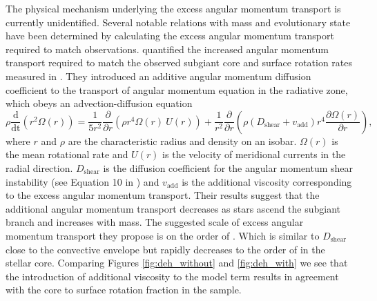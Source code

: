 The physical mechanism underlying the excess angular momentum transport is currently unidentified.
Several notable relations with mass and evolutionary state have been determined by calculating the excess angular momentum transport required to match observations. 
\citet{spada_angular_2016} quantified the increased angular momentum transport required to match the observed subgiant core and surface rotation rates measured in \citet{deheuvels_seismic_2014}.
They introduced an additive angular momentum diffusion coefficient to the transport of angular momentum equation in the radiative zone, which obeys an advection-diffusion equation 
\begin{equation}
    \rho \frac{\text{d}}{\text{dt}}\left(r^2 \Omega \left( r \right)\right) = \frac{1}{5r^2}\frac{\partial}{\partial r}\left(\rho r^4 \Omega \left( r \right)
 \ U\left(r\right)\right) + \frac{1}{r^2}\frac{\partial}{\partial r} \left(\rho \left( D_{\text{shear}} + v_{\text{add}}\right) r^4 \frac{\partial \Omega\left( r \right)}{\partial r}\right),
\end{equation}
where $r$ and $\rho$ are the characteristic radius and density on an isobar. $\Omega(r)$ is the mean rotational rate and $U(r)$ is the velocity of meridional currents in the radial direction. $D_{\text{shear}}$ is the diffusion coefficient for the angular momentum shear instability (see Equation 10 in \citet{eggenberger_effects_2010}) and $v_{\text{add}}$ is the additional viscosity corresponding to the excess angular momentum transport.
Their results suggest that the additional angular momentum transport decreases as stars ascend the subgiant branch and increases with mass.
The suggested scale of excess angular momentum transport they propose is on the order of .
Which is similar to $D_{\text{shear}}$ close to the convective envelope but rapidly decreases to the order of  in the stellar core.
Comparing Figures \ref{fig:deh_without} and \ref{fig:deh_with} we see that the introduction of additional viscosity to the model term results in agreement with the core to surface rotation fraction in the \citet{deheuvels_seismic_2014} sample.

